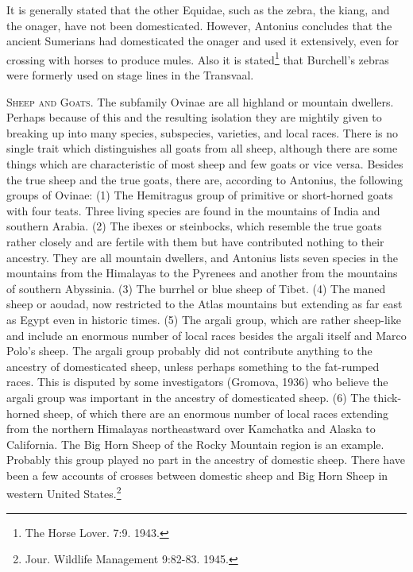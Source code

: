 It is generally stated that the other Equidae, such as the zebra, the kiang, and the onager, have not been
domesticated. However, Antonius concludes that the ancient Sumerians had domesticated the onager and used it
extensively, even for crossing with horses to produce mules. Also it is stated\footnote{The Horse Lover. 7:9.
1943.} that Burchell's zebras were formerly used on stage lines in the Transvaal.

\textsc{Sheep and Goats}. The subfamily Ovinae are all highland or mountain dwellers. Perhaps because of this
and the resulting isolation they are mightily given to breaking up into many species, subspecies, varieties,
and local races. There is no single trait which distinguishes all goats from all sheep, although there are some
things which are characteristic of most sheep and few goats or vice versa. Besides the true sheep and the true
goats, there are, according to Antonius, the following groups of Ovinae: (1) The Hemitragus group of primitive
or short-horned goats with four teats. Three living species are found in the mountains of India and southern
Arabia. (2) The ibexes or steinbocks, which resemble the true goats rather closely and are fertile with them
but have contributed nothing to their ancestry. They are all mountain dwellers, and Antonius lists seven species
in the mountains from the Himalayas to the Pyrenees and another from the mountains of southern Abyssinia. (3)
The burrhel or blue sheep of Tibet. (4) The maned sheep or aoudad, now restricted to the Atlas mountains but
extending as far east as Egypt even in historic times. (5) The argali group, which are rather sheep-like and
include an enormous number of local races besides the argali itself and Marco Polo's sheep. The argali group
probably did not contribute anything to the ancestry of domesticated sheep, unless perhaps something to the
fat-rumped races. This is disputed by some investigators (Gromova, 1936) who believe the argali group was
important in the ancestry of domesticated sheep. (6) The thick-horned sheep, of which there are an enormous
number of local races extending from the northern Himalayas northeastward over Kamchatka and Alaska to
California. The Big Horn Sheep of the Rocky Mountain region is an example. Probably this group played no
part in the ancestry of domestic sheep. There have been a few accounts of crosses between domestic sheep
and Big Horn Sheep in western United States.\footnote{Jour. Wildlife Management 9:82-83. 1945.}

